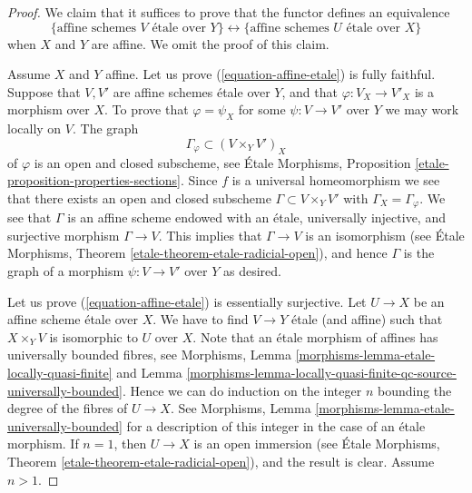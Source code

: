 \begin{proof}
We claim that it suffices to prove that the functor defines
an equivalence
\begin{equation}
\label{equation-affine-etale}
\{
\text{affine schemes }V\text{ \'etale over }Y
\}
\leftrightarrow
\{
\text{affine schemes }U\text{ \'etale over }X
\}
\end{equation}
when $X$ and $Y$ are affine. We omit the proof of this claim.

\medskip\noindent
Assume $X$ and $Y$ affine.
Let us prove (\ref{equation-affine-etale}) is fully faithful. Suppose that
$V, V'$ are affine schemes \'etale over $Y$, and that $\varphi : V_X \to V'_X$
is a morphism over $X$. To prove that $\varphi = \psi_X$ for some
$\psi : V \to V'$ over $Y$ we may work locally on $V$. The graph
$$
\Gamma_\varphi \subset (V \times_Y V')_X
$$
of $\varphi$ is an open and closed subscheme, see
\'Etale Morphisms, Proposition \ref{etale-proposition-properties-sections}.
Since $f$ is a universal homeomorphism we see that there exists an
open and closed subscheme $\Gamma \subset V \times_Y V'$ with
$\Gamma_X = \Gamma_\varphi$. We see that $\Gamma$ is an affine scheme
endowed with an \'etale, universally injective, and surjective morphism
$\Gamma \to V$. This implies that $\Gamma \to V$ is an isomorphism (see
\'Etale Morphisms, Theorem \ref{etale-theorem-etale-radicial-open}),
and hence $\Gamma$ is the graph of a morphism $\psi : V \to V'$ over $Y$
as desired.

\medskip\noindent
Let us prove (\ref{equation-affine-etale}) is essentially surjective.
Let $U \to X$ be an affine scheme \'etale over $X$.
We have to find $V \to Y$ \'etale (and affine) such that $X \times_Y V$
is isomorphic to $U$ over $X$. Note that an \'etale morphism of affines
has universally bounded fibres, see
Morphisms,
Lemma \ref{morphisms-lemma-etale-locally-quasi-finite} and
Lemma \ref{morphisms-lemma-locally-quasi-finite-qc-source-universally-bounded}.
Hence we can do induction on the integer $n$ bounding the degree of the fibres
of $U \to X$. See
Morphisms, Lemma \ref{morphisms-lemma-etale-universally-bounded}
for a description of this integer in the case of an \'etale morphism.
If $n = 1$, then $U \to X$ is an open immersion (see
\'Etale Morphisms, Theorem \ref{etale-theorem-etale-radicial-open}),
and the result is clear. Assume $n > 1$.


\end{proof}
